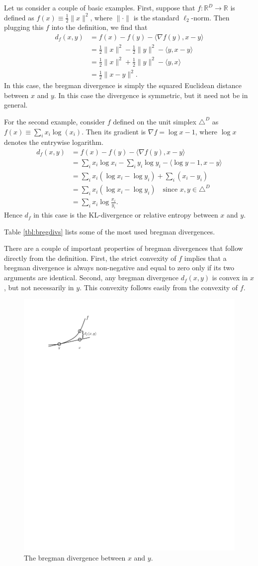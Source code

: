 \documentclass{article}
\newcommand{\R}{\mathbb{R}}
\begin{document}
Let us consider a couple of basic examples.  First, suppose that $f:
\R^D \rightarrow \R$ is defined as $f(x) \equiv \frac{1}{2} 
\|x\|^2$, where $\|\cdot\|$ is the standard $\ell_2$-norm.  Then
plugging this $f$ into the definition, we find that  
\begin{align*}
d_f(x,y) &= f(x) - f(y) - \langle \nabla f(y),x-y \rangle \\
&= \frac{1}{2}\|x\|^2 - \frac{1}{2} \|y\|^2 -\langle y, x-y \rangle\\
&= \frac{1}{2}\|x\|^2 + \frac{1}{2} \|y\|^2 -\langle y, x \rangle\\
&= \frac{1}{2}\|x-y\|^2.
\end{align*}
In this case, the bregman divergence is simply the squared Euclidean
distance between $x$ and $y$.  In this case the divergence is
symmetric, but it need not be in general.

For the second example, consider $f$ defined on the unit simplex
$\triangle^D$ as $f(x)\equiv \sum_i x_i\log(x_i)$.  Then its gradient is
$\nabla f = \log{x} -1$, where $\log{x}$ denotes the entrywise
logarithm.  
\begin{align*}
d_f(x,y) &= f(x) - f(y) - \langle \nabla f(y),x-y \rangle \\
&= \sum_i x_i\log{x_i} - \sum_i y_i\log{y_i} - \langle \log{y}-1,x-y
\rangle\\
&= \sum_i x_i\left(\log{x_i} - \log{y_i}\right) + \sum_i (x_i - y_i)\\
&= \sum_i x_i\left(\log{x_i} - \log{y_i}\right) \quad\mbox{since
  $x,y\in \triangle^D$}\\
&= \sum_i x_i\log{\frac{x_i}{y_i}}.  
\end{align*}
Hence $d_f$ in this case is the KL-divergence or relative entropy
between $x$ and $y$. 

Table \ref{tbl:bregdivs} lists some of the most used bregman
divergences.   

There are a couple of important properties of bregman divergences that
follow directly from the definition.  First, the strict convexity of
$f$ implies that a bregman divergence is always non-negative and equal
to zero only if its two arguments are identical.  Second, any bregman
divergence $d_f(x,y)$ is convex in $x$, but not necessarily in
$y$.  This convexity follows easily from the convexity of $f$.  

\begin{figure}
\begin{center}
\includegraphics[width=0.35\linewidth, height=!]{figs/bregDef.pdf}
\caption{The bregman divergence between $x$ and $y$.}
\label{fig:bregDef}
\end{center}
\end{figure}
\end{document}

